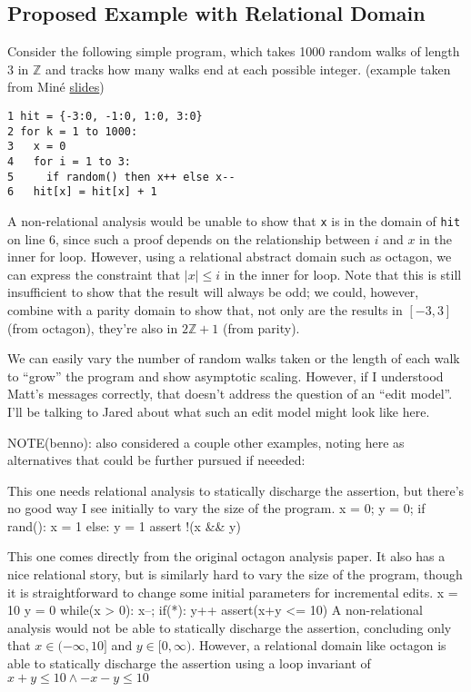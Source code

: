 \documentclass[acmlarge,anonymous]{acmart}\settopmatter{printfolios=true}
\begin{document}
\subsection{Proposed Example with Relational Domain}

Consider the following simple program, which takes 1000 random walks of length 3 in $\mathbb{Z}$ and tracks how many walks end at each possible integer. (example taken from Min\'e \href{https://pdfs.semanticscholar.org/ccb9/2bfe24199455d7c4a430f756c915cd4e5ae8.pdf}{slides})
\begin{lstlisting}
1 hit = {-3:0, -1:0, 1:0, 3:0}
2 for k = 1 to 1000:
3   x = 0
4   for i = 1 to 3:
5     if random() then x++ else x--
6   hit[x] = hit[x] + 1
\end{lstlisting}

A non-relational analysis would be unable to show that \texttt{x} is in the domain of \texttt{hit} on line 6, since such a proof depends on the relationship between $i$ and $x$ in the inner for loop.  However,  using a relational abstract domain such as octagon, we can express the constraint that $|x|\leq i$ in the inner for loop.  Note that this is still insufficient to show that the result will always be odd; we could, however, combine with a parity domain to show that, not only are the results in $[-3,3]$ (from octagon), they're also in $2\mathbb{Z}+1$ (from parity).

We can easily vary the number of random walks taken or the length of each walk to ``grow'' the program and show asymptotic scaling.  However, if I understood Matt's messages correctly, that doesn't address the question of an ``edit model''.  I'll be talking to Jared about what such an edit model might look like here.

\iffalse NOTE(benno): also considered a couple other examples, noting here as alternatives that could be further pursued if neeeded:

This one needs relational analysis to statically discharge the assertion, but there's no good way I see initially to vary the size of the program.
  x = 0;
  y = 0;
  if rand():
    x = 1
  else:
    y = 1
    assert !(x && y)

This one comes directly from the original octagon analysis paper.  It also has a nice relational story, but is similarly hard to vary the size of the program, though it is straightforward to change some initial parameters for incremental edits.
    x = 10
    y = 0
    while(x > 0):
      x--;
      if(*):
        y++
    assert(x+y <= 10)  
A non-relational analysis would not be able to statically discharge the assertion, concluding only that $x\in (-\infty,10]$ and $y\in [0,\infty)$.  However, a relational domain like octagon is able to statically discharge the assertion using a loop invariant of $x+y\leq10\wedge-x-y\leq10$
\end{document}
